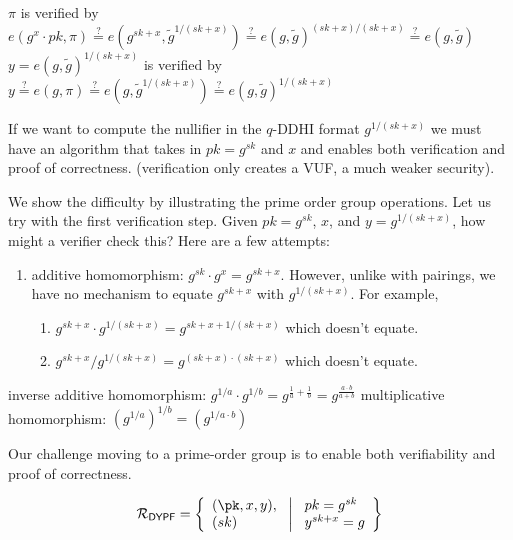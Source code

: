 $\pi$ is verified by $e(g^x \cdot pk, \pi) \stackrel{?}{=} e(g^{sk+x}, \tilde{g}^{1/(sk+x)}) \stackrel{?}{=} e(g, \tilde{g})^{(sk+x)/(sk+x)} \stackrel{?}{=} e(g, \tilde{g}) $ 
$y = e(g, \tilde{g})^{1/(sk+x)}$ is verified by $y \stackrel{?}{=} e(g, \pi)  \stackrel{?}{=} e(g,\tilde{g}^{1/(sk+x)}) \stackrel{?}{=} e(g, \tilde{g})^{1/(sk+x)}$

If we want to compute the nullifier in the $q$-DDHI format $g^{1/(sk+x)}$ we must have an algorithm that takes in $pk = g^{sk}$ and $x$ and enables both verification and proof of correctness. (verification only creates a VUF, a much weaker security).

We show the difficulty by illustrating the prime order group operations. 
Let us try with the first verification step. 
Given $pk = g^{sk}$, $x$, and $y = g^{1/(sk+x)}$, how might a verifier check this?
Here are a few attempts:
\begin{enumerate}
    \item additive homomorphism: $g^{sk} \cdot g^x = g^{sk+x}$. However, unlike with pairings, we have no mechanism to equate $g^{sk+x}$ with $g^{1/(sk+x)}$. For example, 
    \begin{enumerate}
        \item $g^{sk+x} \cdot g^{1/(sk+x)} = g^{sk+x + 1/(sk+x)}$ which doesn't equate. 
        \item $g^{sk+x}/g^{1/(sk+x)} = g^{(sk+x) \cdot (sk+x)}$ which doesn't equate. 
    \end{enumerate}

\end{enumerate}


inverse additive homomorphism: $g^{1/a} \cdot g^{1/b} = g^{\frac{1}{a}+\frac{1}{b}} = g^{\frac{a\cdot b}{a + b}}$
multiplicative homomorphism: $(g^{1/a})^{1/b} = (g^{1/a \cdot b})$


Our challenge moving to a prime-order group is to enable both verifiability and proof of correctness. 


\[
\mathcal{R}_{\mathsf{DY PF}} = \left\{ 
\begin{array}{l} 
(\pk, x, y),\\
(sk) 
\end{array}
\ \middle|
\ \begin{array}{l}
pk = g^{sk} \\
y^{sk + x} = g  \\
\end{array} \right\}
\]



